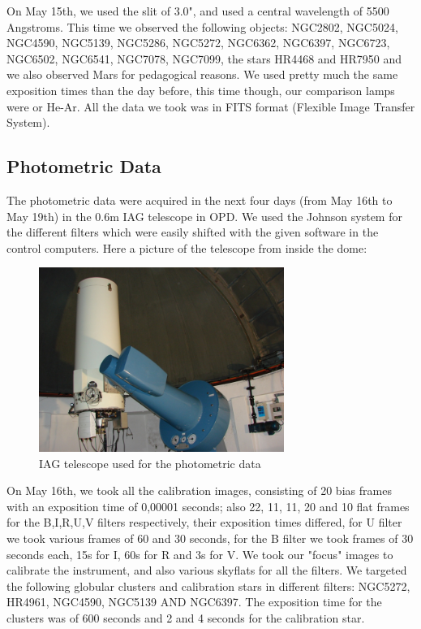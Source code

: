 On May 15th, we used the slit of 3.0", and used a central wavelength of 5500 Angstroms. This time we observed the following objects: NGC2802, NGC5024, NGC4590, NGC5139, NGC5286, NGC5272, NGC6362, NGC6397, NGC6723, NGC6502, NGC6541, NGC7078, NGC7099, the stars HR4468 and HR7950 and we also observed Mars for pedagogical reasons. We used pretty much the same exposition times than the day before, this time though, our comparison lamps were or He-Ar. All the data we took was in FITS format (Flexible Image Transfer System).

\subsection{Photometric Data}

The photometric data were acquired in the next four days (from May 16th to May 19th) in the 0.6m IAG telescope in OPD. We used the Johnson system for the different filters which were easily shifted with the given software in the control computers. Here a picture of the telescope from inside the dome:

\begin{figure}[H]
\centering
\includegraphics[width=8cm]{images/opd-photometry.jpg}
\caption[IAG Telescope used for Photometry]{IAG telescope used for the photometric data}
\end{figure}

On May 16th, we took all the calibration images, consisting of 20 bias frames with an exposition time of 0,00001 seconds; also 22, 11, 11, 20 and 10 flat frames for the B,I,R,U,V filters respectively, their exposition times differed, for  U filter we took various frames of 60 and 30 seconds, for the B filter we took frames of 30 seconds each, 15s for I, 60s for R and 3s for V. We took our "focus" images to calibrate the instrument, and also various skyflats for all the filters. We targeted the following globular clusters and calibration stars in different filters: NGC5272, HR4961, NGC4590, NGC5139 AND NGC6397. The exposition time for the clusters was of 600 seconds and 2 and 4 seconds for the calibration star. 


